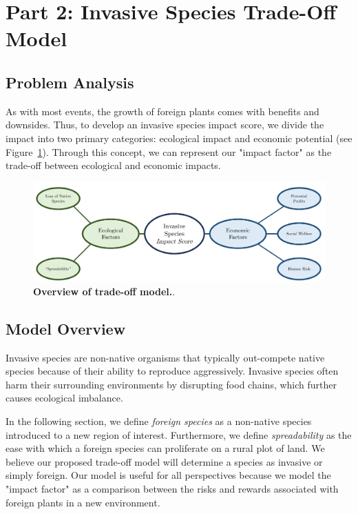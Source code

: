 \section{Part 2: Invasive Species Trade-Off Model}

\subsection{Problem Analysis}
As with most events, the growth of foreign plants comes with benefits and downsides. Thus, to develop an invasive species impact score, we divide the impact into two primary categories: ecological impact and economic potential (see Figure~\ref{fig:invasiveimpactbrainstorm}). Through this concept, we can represent our "impact factor" as the trade-off between ecological and economic impacts. 

\begin{figure}[h!]
\centering
    \includegraphics[scale=0.5]{figures/invasivespeciesimpactscore.pdf}
    \captionsetup{width=0.9\textwidth}
    \caption{\textbf{Overview of trade-off model.}.}
    \label{fig:invasiveimpactbrainstorm}
\end{figure}

\subsection{Model Overview}

Invasive species are non-native organisms that typically out-compete native species because of their ability to reproduce aggressively. Invasive species often harm their surrounding environments by disrupting food chains, which further causes ecological imbalance. 

In the following section, we define \textit{foreign species} as a non-native species introduced to a new region of interest. Furthermore, we define \textit{spreadability} as the ease with which a foreign species can proliferate on a rural plot of land. We believe our proposed trade-off model will determine a species as invasive or simply foreign. Our model is useful for all perspectives because we model the "impact factor" as a comparison between the risks and rewards associated with foreign plants in a new environment. 



